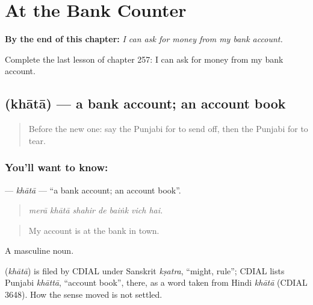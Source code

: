 
\chapter{At the Bank Counter}
\label{ch:pa-a2-at-the-bank-counter}

\begin{chapteropening}
\textbf{By the end of this chapter:} \emph{I can ask for money from my bank account.}

Complete the last lesson of chapter 257: I can ask for money from my bank account.
\end{chapteropening}

\section[\texorpdfstring{\pa{ਖਾਤਾ} (khātā)}{ਖਾਤਾ (khātā)}]{ (khātā) — a bank account; an account book}

\label{lesson:PA-C257-khata}



\begin{quote}
Before the new one: say the Punjabi for to send off, then the Punjabi for to tear.
\end{quote}

\subsection*{You'll want to know: }
\textbf{} — \emph{khātā} — \textquotedblleft{}a bank account; an account book\textquotedblright{}.

\begin{quote}
      
\end{quote}

\begin{quote}
\emph{merā khātā shahir de baiṅk vich hai.}
\end{quote}

\begin{quote}
My account is at the bank in town.
\end{quote}

A masculine noun.

\begin{cousinweb}
\textbf{} (\emph{khātā}) is filed by CDIAL under Sanskrit \emph{kṣatra}, \textquotedblleft{}might, rule\textquotedblright{}; CDIAL lists Punjabi \emph{khāttā}, \textquotedblleft{}account book\textquotedblright{}, there, as a word taken from Hindi \emph{khātā} (CDIAL 3648). How the sense moved is not settled.
\end{cousinweb}

